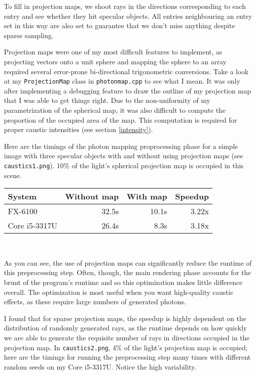 \documentclass{article}
\begin{document}
To fill in projection maps, we shoot rays in the directions corresponding
to each entry and see whether they hit specular objects. All entries
neighbouring an entry set in this way are also set to guarantee that we don't
miss anything despite sparse sampling.

Projection maps were one of my most difficult features to implement, as projecting vectors onto a unit sphere and mapping the sphere to an array required several error-prone bi-directional trigonometric conversions. Take a look at my {\tt ProjectionMap} class in {\tt photonmap.cpp} to see what I mean. It was only after implementing a debugging feature to draw the outline of my projection map that I was able to get things right. Due to the non-uniformity of my parametrization of the spherical map, it was also difficult to compute the proportion of the occupied area of the map. This computation is required for proper caustic intensities (see section \ref{intensity}).

Here are the timings of the photon mapping proprocessing phase for a simple
image with three specular objects with and without using projection maps (see
{\tt caustics1.png}). 10\% of the light's spherical projection map is occupied
in this scene.

\begin{center}
\begin{tabular}{|l|r|r|r|} \hline
 System & Without map & With map & Speedup \\\hline
 FX-6100 & 32.5s & 10.1s & 3.22x \\\hline
 Core i5-3317U & 26.4s & 8.3s & 3.18x \\\hline
\end{tabular} \\
\end{center}

As you can see, the use of projection maps can significantly reduce the runtime
of this preprocessing step. Often, though, the main rendering phase accounts for
the brunt of the program's runtime and so this optimization makes little
difference overall. The optimization is most useful when you want high-quality
caustic effects, as these require large numbers of generated photons.

I found that for sparse projection maps, the speedup is highly dependent on the distribution of randomly generated rays, as the runtime depends on how quickly we are able to generate the requisite number of rays in directions occupied in the projection map. In {\tt caustics2.png}, 4\% of the light's projection map is occupied; here are the timings for running the preprocessing step many times with different random seeds on my Core i5-3317U. Notice the high variability.
\end{document}
